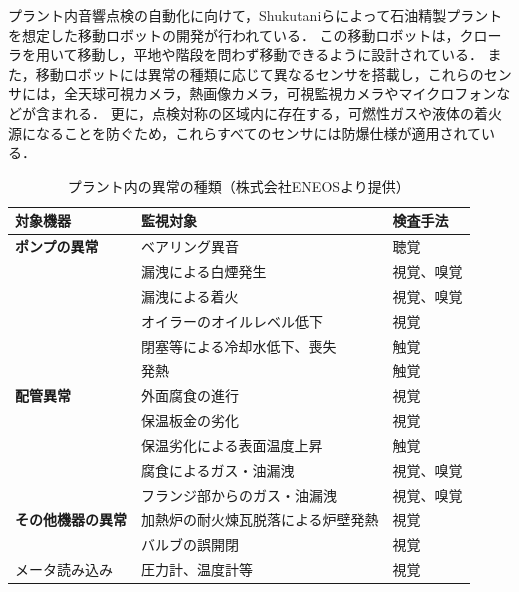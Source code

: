 \documentclass[../main]{subfiles}
\begin{document}
プラント内音響点検の自動化に向けて，Shukutaniらによって石油精製プラントを想定した移動ロボットの開発が行われている．
この移動ロボットは，クローラを用いて移動し，平地や階段を問わず移動できるように設計されている．
また，移動ロボットには異常の種類に応じて異なるセンサを搭載し，これらのセンサには，全天球可視カメラ，熱画像カメラ，可視監視カメラやマイクロフォンなどが含まれる．
更に，点検対称の区域内に存在する，可燃性ガスや液体の着火源になることを防ぐため，これらすべてのセンサには防爆仕様が適用されている．
\begin{table}[t]
  \caption{プラント内の異常の種類（株式会社ENEOSより提供）}
  \label{tab:plant_anomalies}
  \centering
  \begin{tabular}{lll}
    \toprule
    対象機器 & 監視対象 & 検査手法 \\
    \midrule
    \textbf{ポンプの異常} & ベアリング異音 & 聴覚 \\
                 & 漏洩による白煙発生 & 視覚、嗅覚 \\
                 & 漏洩による着火 & 視覚、嗅覚 \\
                 & オイラーのオイルレベル低下 & 視覚 \\
                 & 閉塞等による冷却水低下、喪失 & 触覚 \\
                 & 発熱 & 触覚 \\
    \midrule
    \textbf{配管異常} & 外面腐食の進行 & 視覚 \\
               & 保温板金の劣化 & 視覚 \\
               & 保温劣化による表面温度上昇 & 触覚 \\
               & 腐食によるガス・油漏洩 & 視覚、嗅覚 \\
               & フランジ部からのガス・油漏洩 & 視覚、嗅覚 \\
    \midrule
    \textbf{その他機器の異常} & 加熱炉の耐火煉瓦脱落による炉壁発熱 & 視覚 \\
                   & バルブの誤開閉 & 視覚 \\
    \midrule
    メータ読み込み & 圧力計、温度計等 & 視覚 \\
    \bottomrule
  \end{tabular}
\end{table}
\end{document}
